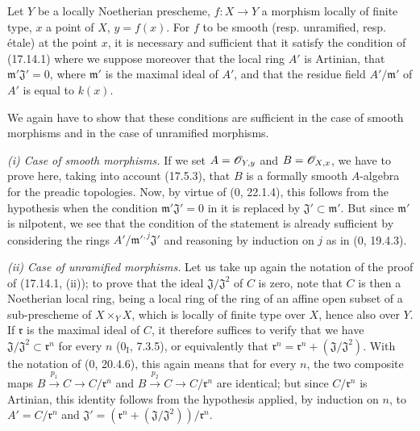\begin{proposition}[17.14.2]
\label{IV.17.14.2}
Let $Y$ be a locally Noetherian prescheme, $f:X\to Y$ a morphism locally of finite type, $x$ a point of $X$, $y=f(x)$. For $f$ to be smooth (resp. unramified, resp. étale) at the point $x$, it is necessary and sufficient that it satisfy the condition of (17.14.1) where we suppose moreover that the local ring $A'$ is Artinian, that $\mathfrak m'\mathfrak{J}'=0$, where $\mathfrak m'$ is the maximal ideal of $A'$, and that the residue field $A'/\mathfrak m'$ of $A'$ is equal to $k(x)$.
\end{proposition}

We again have to show that these conditions are sufficient in the case of smooth morphisms and in the case of unramified morphisms.


\emph{(i) Case of smooth morphisms.} If we set $A=\mathscr{O}_{Y,y}$ and $B=\mathscr{O}_{X,x}$, we have to prove here, taking into account (17.5.3), that $B$ is a formally smooth $A$-algebra for the preadic topologies. Now, by virtue of (0, 22.1.4), this follows from the hypothesis when the condition $\mathfrak m'\mathfrak{J}'=0$ in it is replaced by $\mathfrak{J}'\subset\mathfrak m'$. But since $\mathfrak m'$ is nilpotent, we see that the condition of the statement is already sufficient by considering the rings $A'/\mathfrak m'^{,j}\mathfrak{J}'$ and reasoning by induction on $j$ as in (0, 19.4.3).

\emph{(ii) Case of unramified morphisms.} Let us take up again the notation of the proof of (17.14.1, (ii)); to prove that the ideal $\mathfrak{J}/\mathfrak{J}^2$ of $C$ is zero, note that $C$ is then a Noetherian local ring, being a local ring of the ring of an affine open subset of a sub-prescheme of $X\times_YX$, which is locally of finite type over $X$, hence also over $Y$. If $\mathfrak r$ is the maximal ideal of $C$, it therefore suffices to verify that we have $\mathfrak{J}/\mathfrak{J}^2\subset\mathfrak r^n$ for every $n$ (0$_{\mathrm I}$, 7.3.5), or equivalently that $\mathfrak r^n=\mathfrak r^n+(\mathfrak{J}/\mathfrak{J}^2)$. With the notation of (0, 20.4.6), this again means that for every $n$, the two composite maps $B\xrightarrow{p_1}C\to C/\mathfrak r^n$ and $B\xrightarrow{p_2}C\to C/\mathfrak r^n$ are identical; but since $C/\mathfrak r^n$ is Artinian, this identity follows from the hypothesis applied, by induction on $n$, to $A'=C/\mathfrak r^n$ and $\mathfrak{J}'=(\mathfrak r^n+(\mathfrak{J}/\mathfrak{J}^2))/\mathfrak r^n$.

